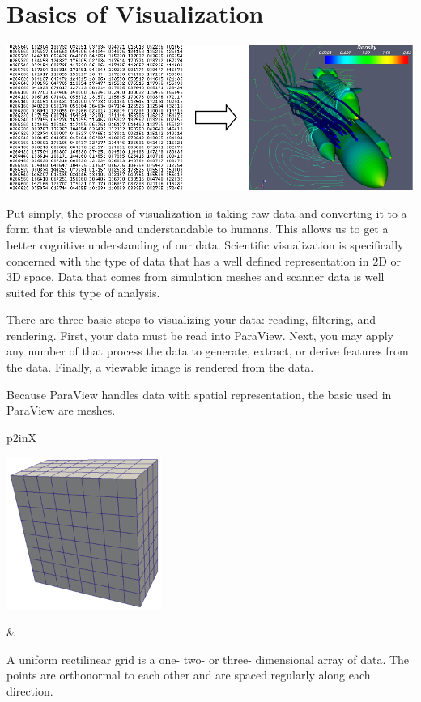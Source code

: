 \pagebreak
\section{Basics of Visualization}

\begin{inlinefig}
  \includegraphics[width=\linewidth]{images/BasicsOfVisualization}
\end{inlinefig}

Put simply, the process of visualization is taking raw data and converting
it to a form that is viewable and understandable to humans.  This allows us
to get a better cognitive understanding of our data.  Scientific
visualization is specifically concerned with the type of data that has a
well defined representation in 2D or 3D space.  Data that comes from
simulation meshes and scanner data is well suited for this type of
analysis.

There are three basic steps to visualizing your data: reading, filtering,
and rendering.  First, your data must be read into ParaView.  Next, you may
apply any number of  that process the data to generate,
extract, or derive features from the data.  Finally, a viewable image is
rendered from the data.

Because ParaView handles data with spatial representation, the basic
 used in ParaView are meshes.

\noindent
\begin{tabularx}{\linewidth}{p{2in}X}
  \parbox{2in}{\includegraphics[width=2in]{images/ImageData}} &
  \begin{minipage}{\linewidth}

    A uniform rectilinear grid is a one- two- or three- dimensional array of
    data.  The points are orthonormal to each other and are spaced regularly
    along each direction.
  \end{minipage}
\end{tabularx}

